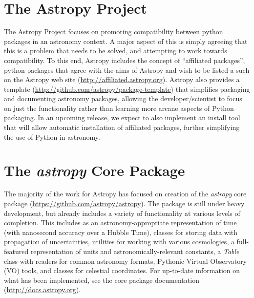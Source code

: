 \section{The Astropy Project}
The Astropy Project focuses on promoting compatibility between python packages in an astronomy context.  A major aspect of this is simply agreeing that this is a problem that needs to be solved, and attempting to work towards compatibility.  To this end, Astropy includes the concept of ``affiliated packages'', python packages that agree with the aims of Astropy and wish to be listed a such on the Astropy web site (\url{http://affiliated.astropy.org}).  Astropy also provides a template (\url{http://github.com/astropy/package-template}) that simplifies packaging and documenting astronomy packages, allowing the developer/scientist to focus on just the functionality rather than learning more arcane aspects of Python packaging.  In an upcoming release, we expect to also implement an install tool that will allow automatic installation of affiliated packages, further simplifying the use of Python in astronomy.

\section{The {\it astropy} Core Package} 
The majority of the work for Astropy has focused on creation of the {\it astropy} core package (\url{https://github.com/astropy/astropy}).  The package is still under heavy development, but already includes a variety of functionality at various levels of completion.  This includes as an astronomy-appropriate representation of time (with nanosecond accuracy over a Hubble Time), classes for storing data with propagation of uncertainties, utilities for working with various cosmologies, a full-featured representation of units and astronomically-relevant constants, a {\it Table} class with readers for common astronomy formats, Pythonic Virtual Observatory (VO) tools, and classes for celestial coordinates.  For up-to-date information on what has been implemented, see the core package documentation (\url{http://docs.astropy.org}).

